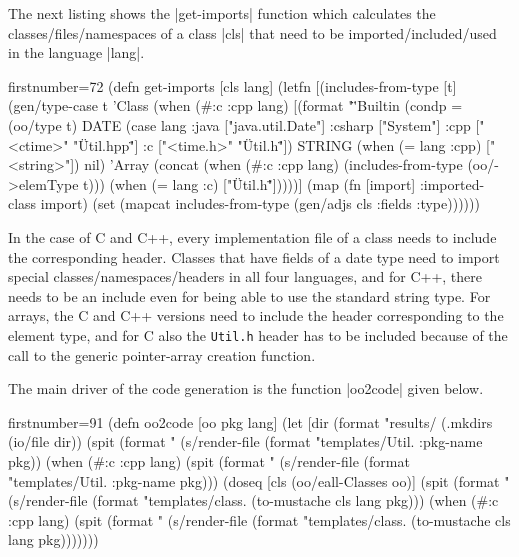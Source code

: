\documentclass[a4paper]{article}
\newcommand{\code}{\clojureinline}
\begin{document}
The next listing shows the \code|get-imports| function which calculates the
classes/files/namespaces of a class \code|cls| that need to be
imported/included/used in the language \code|lang|.

\begin{clojurecode*}{firstnumber=72}
(defn get-imports [cls lang]
  (letfn [(includes-from-type [t]
            (gen/type-case t
              'Class   (when (#{:c :cpp} lang)
                         [(format "\"%
              'Builtin (condp = (oo/type t)
                         DATE   (case lang
                                    :java   ["java.util.Date"]
                                    :csharp ["System"]
                                    :cpp    ["<ctime>" "\"Util.hpp\""]
                                    :c      ["<time.h>" "\"Util.h\""])
                         STRING (when (= lang :cpp) ["<string>"])
                         nil)
              'Array   (concat (when (#{:c :cpp} lang)
                                 (includes-from-type (oo/->elemType t)))
                               (when (= lang :c)
                                 ["\"Util.h\""]))))]
    (map (fn [import] {:imported-class import})
         (set (mapcat includes-from-type (gen/adjs cls :fields :type))))))
\end{clojurecode*}

In the case of C and C++, every implementation file of a class needs to include
the corresponding header.  Classes that have fields of a date type need to
import special classes/namespaces/headers in all four languages, and for C++,
there needs to be an include even for being able to use the standard string
type.  For arrays, the C and C++ versions need to include the header
corresponding to the element type, and for C also the \texttt{Util.h} header
has to be included because of the call to the generic pointer-array creation
function.

The main driver of the code generation is the function \code|oo2code| given
below.

\begin{clojurecode*}{firstnumber=91}
(defn oo2code [oo pkg lang]
  (let [dir (format "results/%
    (.mkdirs (io/file dir))
    (spit (format "%
          (s/render-file (format "templates/Util.%
                         {:pkg-name pkg}))
    (when (#{:c :cpp} lang)
      (spit (format "%
            (s/render-file (format "templates/Util.%
                           {:pkg-name pkg})))
    (doseq [cls (oo/eall-Classes oo)]
      (spit (format "%
            (s/render-file (format "templates/class.%
                           (to-mustache cls lang pkg)))
      (when (#{:c :cpp} lang)
        (spit (format "%
              (s/render-file (format "templates/class.%
                             (to-mustache cls lang pkg)))))))
\end{clojurecode*}
\end{document}
